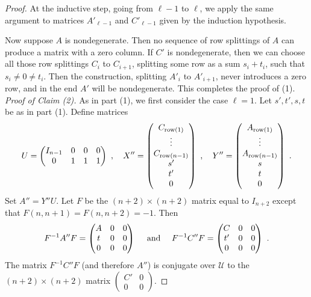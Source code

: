 \documentclass{amsart}
\theoremstyle{definition}
\theoremstyle{remark}
\numberwithin{equation}{section}
\begin{document}
{{\begin{proof}
At the inductive step, going from $\ell -1$ to $\ell$, 
we apply the same argument to matrices $A'_{\ell -1}$ and 
$C'_{\ell -1}$ given by the induction hypothesis. 

Now suppose $A$ is nondegenerate.  Then no sequence
of row splittings of $A$ can produce a matrix with  a 
zero column. If $C'$ is nondegenerate, then we can 
choose all those row splittings $C_i$ to $C_{i+1}$, 
splitting some row as a sum $s_i + t_i$, such that 
$s_i\neq 0 \neq t_i$. Then the construction, splitting 
$A'_i$ to $A'_{i+1}$, never introduces a zero row, 
and in the end $A'$ will be nondegenerate. 
This completes the proof of (1). 
\newline \newline 
{\it Proof of Claim (2).} 
As in part (1), we first consider the case $\ell =1$. 
Let $s',t',s,t$ be as in part (1).  
Define  matrices 
\[ 
U = 
\begin{pmatrix} I_{n-1} & 0 & 0 & 0 \\ 0 & 1 & 1 & 1 
\end{pmatrix} \ , \quad 
X'' = 
\begin{pmatrix} C_{\textnormal{row}(1)} \\ \vdots \\ C_{\textnormal{row}(n-1)} \\ s' \\ t' \\ 0 
\end{pmatrix} \ , \quad 
Y'' = 
\begin{pmatrix} A_{\textnormal{row}(1)} \\ \vdots \\ A_{\textnormal{row}(n-1)} \\ s \\ t \\ 0 
\end{pmatrix} \ . 
\] 
Set $A''= Y''U$. Let $F$ be the $(n+2)\times (n+2) $ 
matrix equal to $I_{n+2}$ except that 
$F(n,n+1)=F(n,n+2)= -1$. Then 
\[
F^{-1}A''F = 
\begin{pmatrix} A & 0 & 0  \\ t & 0 & 0 \\ 0 & 0 & 0 
\end{pmatrix} \quad \textnormal { and  } \quad 
F^{-1}C''F = 
\begin{pmatrix} C & 0 & 0  \\ t' & 0 & 0 \\ 0 & 0 & 0 
\end{pmatrix} \ .  
\] 
The matrix $ F^{-1}C''F $ 
(and therefore $A''$) 
is conjugate over $\mathcal U$ to the 
$(n+2)\times (n+2)$ matrix 
$\left(\begin{smallmatrix} C' & 0 \\ 0& 0 
\end{smallmatrix}\right) $.  


\end{proof}}}
\end{document}
